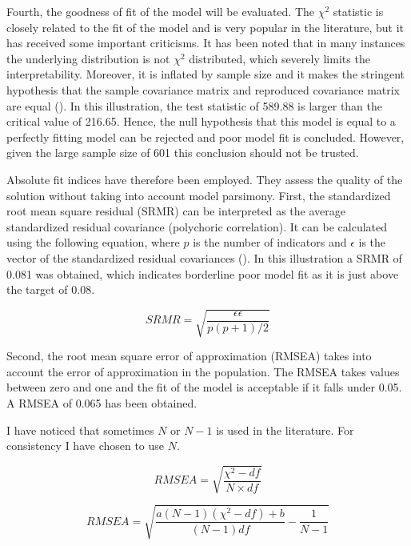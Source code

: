 \documentclass[11pt]{article}
\begin{document}
Fourth, the goodness of fit of the model will be evaluated.
The $\chi^2$ statistic is closely related to the fit of the model and is very
popular in the literature, but it has received some important criticisms. It has
been noted that in many instances the underlying distribution is not $\chi^2$
distributed, which severely limits the interpretability. Moreover, it is
inflated by sample size and it makes the stringent hypothesis that the sample
covariance matrix and reproduced covariance matrix are equal (\cite{brown2015}).
In this illustration, the test statistic of 589.88 is larger than the critical
value of 216.65. Hence, the null hypothesis that this model is equal to a
perfectly fitting model can be rejected and poor model fit is concluded. However,
given the large sample size of 601 this conclusion should not be trusted.

Absolute fit indices have therefore been employed. They assess the quality of
the solution without taking into account model parsimony. First, the standardized
root mean square residual (SRMR) can be interpreted as the average standardized
residual covariance (polychoric correlation). It can be calculated using the
following equation, where $p$ is the number of indicators and $\epsilon$ is
the vector of the standardized residual covariances (\cite{shi2020}). In this
illustration a SRMR of 0.081 was obtained, which indicates borderline poor model
fit as it is just above the target of 0.08.

\begin{equation}
  SRMR = \sqrt{\dfrac{\epsilon \epsilon}{p(p+1)/2}}
\end{equation}

Second, the root mean square error of approximation (RMSEA) takes into
account the error of approximation in the population. The RMSEA takes values
between zero and one and the fit of the model is acceptable if it falls under 0.05.
A RMSEA of 0.065 has been obtained.

I have noticed that sometimes $N$ or $N-1$ is used in the literature. For
consistency I have chosen to use $N$.

\begin{equation}
  RMSEA = \sqrt{\dfrac{\chi^2 - df}{N \times df}}
\end{equation}

\begin{equation}
  RMSEA = \sqrt{\dfrac{a (N-1) (\chi^2 - df) + b}{(N-1) df} - \dfrac{1}{N-1}}
\end{equation}
\end{document}
